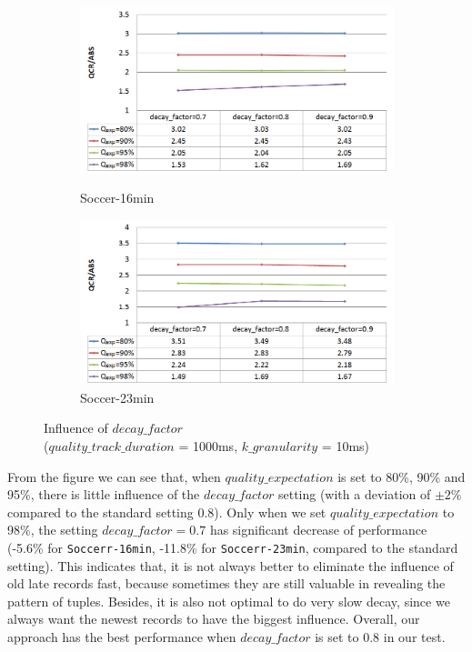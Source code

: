\documentclass[a4paper, 11pt, twoside]{report}
\begin{document}
\begin{figure}[H]
	\centering
	\begin{subfigure}[t]{5in}
		\centering
		\includegraphics[width=5in]{influence-elimination-rate-16min}
		\caption{Soccer-16min}
		\hspace{5pt}
		\includegraphics[width=5in]{influence-elimination-rate-23min}
		\caption{Soccer-23min}	
	\end{subfigure}
	\caption{Influence of $decay\_factor$ \protect\\ ($quality\_track\_duration$ = 1000ms, $k\_granularity$ = 10ms)}
	\label{fig:influence-elimination-rate}
\end{figure}

From the figure we can see that, when $quality\_expectation$ is set to 80\%, 90\% and 95\%, there is little influence of the $decay\_factor$ setting (with a deviation of $\pm 2\%$ compared to the standard setting 0.8). Only when we set $quality\_expectation$ to 98\%, the setting $decay\_factor=0.7$ has significant decrease of performance (-5.6\% for \texttt{Soccerr-16min}, -11.8\% for \texttt{Soccerr-23min}, compared to the standard setting). This indicates that, it is not always better to eliminate the influence of old late records fast, because sometimes they are still valuable in revealing the pattern of tuples. Besides, it is also not optimal to do very slow decay, since we always want the newest records to have the biggest influence. Overall, our approach has the best performance when $decay\_factor$ is set to 0.8 in our test.\\
\end{document}
